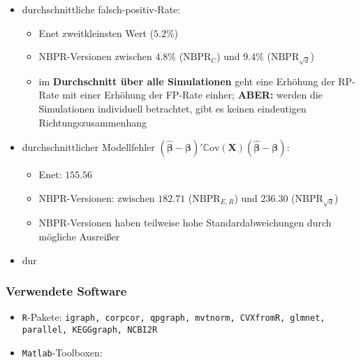 \documentclass{beamer}
\begin{document}
\begin{frame}
	\begin{itemize}
	\item durchschnittliche falsch-positiv-Rate:
	\begin{itemize}
	\item Enet zweitkleinsten Wert ($5.2\%$)
	\item NBPR-Versionen zwischen $4.8\%$ ($\text{NBPR}_{C}$) und $9.4\%$ ($\text{NBPR}_{\sqrt{d}}$)
	\item im \textbf{Durchschnitt über alle Simulationen} geht eine Erhöhung der RP-Rate mit einer Erhöhung der FP-Rate einher; \textbf{ABER:} werden die Simulationen individuell betrachtet, gibt es keinen eindeutigen Richtungszusammenhang  
	\end{itemize}
	\end{itemize}
\end{frame}


\begin{frame}
	\begin{itemize}
	\item durchschnittlicher Modellfehler $(\boldsymbol{\hat{\beta}}- \boldsymbol{\beta})'\mathbb{C}\text{ov}(\mathbf{X})(\boldsymbol{\hat{\beta}}- \boldsymbol{\beta})$:
	\begin{itemize}
	\item Enet: $155.56$
	\item NBPR-Versionen: zwischen $182.71$ ($\text{NBPR}_{E,R}$) und $236.30$ ($\text{NBPR}_{\sqrt{d}}$)
	\item NBPR-Versionen haben teilweise hohe Standardabweichungen durch mögliche Ausreißer
	\end{itemize}
	\item dur
	\end{itemize}
\end{frame}


\begin{frame}
	\frametitle{Verwendete Software}
	\begin{itemize}
	\item \texttt{R}-Pakete: \texttt{igraph, corpcor, qpgraph, mvtnorm, CVXfromR, glmnet, parallel, KEGGgraph, NCBI2R}
	\item \texttt{Matlab}-Toolboxen: 
	\end{itemize}
\end{frame}


%
%


%
\end{document}

